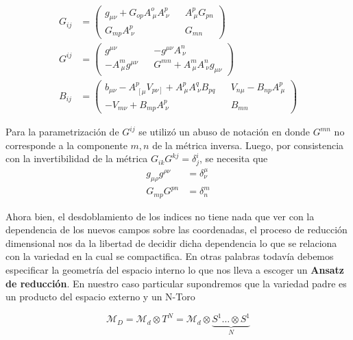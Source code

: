 \documentclass{article}
\numberwithin{equation}{section}
\begin{document}
\begin{subequations}
\begin{align}
\label{Gdown}
G_{i j}&= 
\begin{pmatrix}
g_{\mu \nu} + G_{o p} A^o_{\ \mu} A^p_{\ \nu} && A^p_{\ \mu} G_{p n}\\
G_{m p} A^p_{\ \nu}  && G_{m n}
\end{pmatrix}\\
\label{Gup}
G^{i j} &=
\begin{pmatrix}
g^{\mu \nu}  &&  - g^{\mu \nu} A^n_{\ \nu} \\
- A^m_{\ \mu} g^{\mu \nu}  && G^{m n} + A^m_{\ \mu} A^n_{\ \nu} g_{\mu \nu}
\end{pmatrix}\\
\label{B}
B_{i j} &=
\begin{pmatrix}
b_{\mu \nu} - A^p_{\ \left[\mu \right.} V_{\left. p \nu \right]} + A^p_{\ \mu}A^q_{\ \nu} B_{p q} && V_{n \mu} - B_{n p} A^p_{\ \mu}\\
-V_{m \nu} + B_{m p} A^p_{\ \nu}  && B_{m n}
\end{pmatrix}
\end{align}
\end{subequations}

Para la parametrización de $ G^{i j} $ se utilizó un abuso de notación en donde $ G^{m n} $ no corresponde a la componente $ m, n $ de la métrica inversa. Luego, por consistencia con la invertibilidad de la métrica $ G_{i k} G^{k j} = \delta^i_j $, se necesita que \\

\begin{equation}\label{inversas}
\begin{aligned}
g_{\mu \rho} g^{\rho \nu} &= \delta^{\mu}_{\nu}\\
G_{m p} G^{p n} &= \delta^m_n
\end{aligned}
\end{equation}

Ahora bien, el desdoblamiento de los indices no tiene nada que ver con la dependencia de los nuevos campos sobre las coordenadas, el proceso de reducción dimensional nos da la libertad de decidir dicha dependencia lo que se relaciona con la variedad en la cual se compactifica. En otras palabras todavía debemos especificar la geometría del espacio interno lo que nos lleva a escoger un \textbf{Ansatz de reducción}. En nuestro caso particular supondremos que la variedad padre es un producto del espacio externo y un N-Toro

\begin{equation}\label{toro}
\mathcal{M}_D = \mathcal{M}_d \otimes T^N = \mathcal{M}_d \otimes \underbrace{S^1 \dots \otimes S^1}_{N}
\end{equation}
\end{document}
